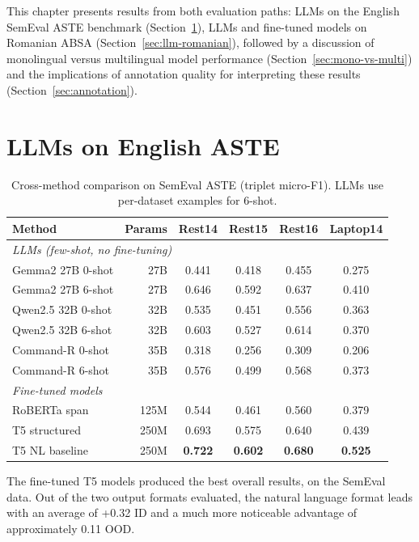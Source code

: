 \documentclass[12pt,a4paper]{report}
\begin{document}
This chapter presents results from both evaluation paths: LLMs on the English SemEval ASTE benchmark 
(Section~\ref{sec:llm-english}), LLMs and fine-tuned models on Romanian ABSA (Section~\ref{sec:llm-romanian}), 
followed by a discussion of monolingual versus multilingual model performance (Section~\ref{sec:mono-vs-multi}) 
and the implications of annotation quality for interpreting these results (Section~\ref{sec:annotation}).

\section{LLMs on English ASTE}\label{sec:llm-english}

\begin{table}[H]
\centering
\caption{Cross-method comparison on SemEval ASTE (triplet micro-F1). LLMs use per-dataset examples for 6-shot.}
\label{tab:llm-semeval}
\small
\begin{tabular}{@{}lrcccc@{}}
\toprule
\textbf{Method} & \textbf{Params} & \textbf{Rest14} & \textbf{Rest15} & \textbf{Rest16} & \textbf{Laptop14} \\
\midrule
\multicolumn{6}{l}{\textit{LLMs (few-shot, no fine-tuning)}} \\
\midrule
Gemma2 27B 0-shot & 27B & 0.441 & 0.418 & 0.455 & 0.275 \\
Gemma2 27B 6-shot & 27B & 0.646 & 0.592 & 0.637 & 0.410 \\
Qwen2.5 32B 0-shot & 32B & 0.535 & 0.451 & 0.556 & 0.363 \\
Qwen2.5 32B 6-shot & 32B & 0.603 & 0.527 & 0.614 & 0.370 \\
Command-R 0-shot & 35B & 0.318 & 0.256 & 0.309 & 0.206 \\
Command-R 6-shot & 35B & 0.576 & 0.499 & 0.568 & 0.373 \\
\midrule
\multicolumn{6}{l}{\textit{Fine-tuned models}} \\
\midrule
RoBERTa span & 125M & 0.544 & 0.461 & 0.560 & 0.379 \\
T5 structured & 250M & 0.693 & 0.575 & 0.640 & 0.439 \\
T5 NL baseline & 250M & \textbf{0.722} & \textbf{0.602} & \textbf{0.680} & \textbf{0.525} \\
\bottomrule
\end{tabular}
\end{table}

The fine-tuned T5 models produced the best overall results, on the SemEval data. Out of the two output formats
evaluated, the natural language format leads with an average of +0.32 ID and a much more noticeable advantage of
approximately 0.11 OOD.
\end{document}
